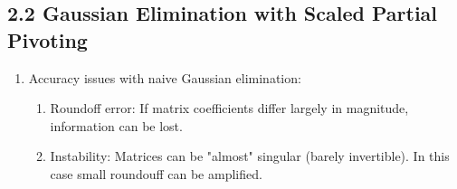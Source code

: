 \documentclass{article}
\theoremstyle{remark}
\begin{document}
\subsection{2.2 Gaussian Elimination with Scaled Partial Pivoting}

\begin{enumerate}


\item Accuracy issues with naive Gaussian elimination:
\begin{enumerate}
\item Roundoff error: If matrix coefficients differ largely in magnitude, information can be lost.
\item Instability: Matrices can be "almost" singular (barely invertible). In this case small roundouff can be amplified.
\end{enumerate}


\end{enumerate}
\end{document}
